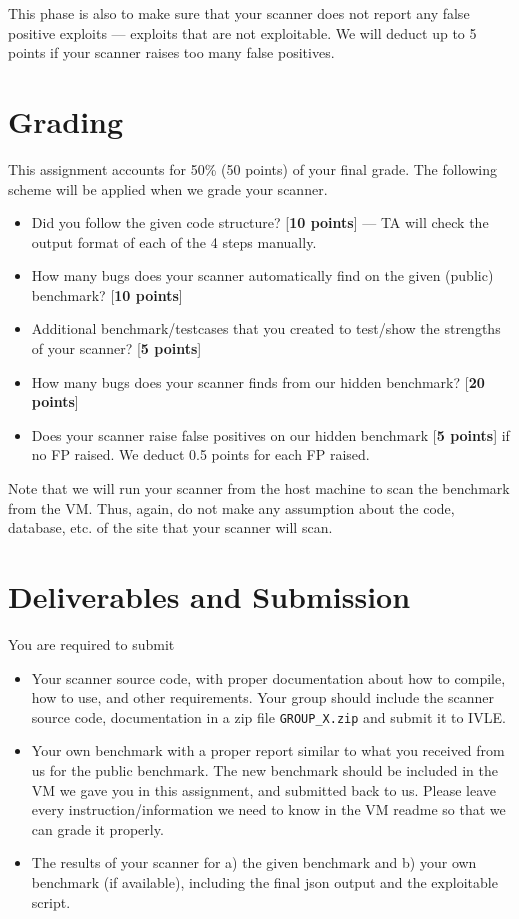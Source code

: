 \documentclass{article}[10pt]
\begin{document}
This phase is also to make sure that your scanner does not report any false positive exploits --- exploits that are not exploitable. We will deduct up to 5 points if your scanner raises too many false positives.


\section{Grading}
This assignment accounts for 50\% (50 points) of your final grade. The following scheme will be applied when we grade your scanner.
	\begin{itemize}
	\item Did you follow the given code structure? [{\bf 10 points}] --- TA will check the output format of each of the 4 steps manually.
	\item How many bugs does your scanner automatically find on the given (public) benchmark? [{\bf 10 points}]
	\item Additional benchmark/testcases that you created to test/show the strengths of your scanner? [{\bf 5 points}]
	\item How many bugs does your scanner finds from our hidden benchmark? [{\bf 20 points}]
	\item Does your scanner raise false positives on our hidden benchmark [{\bf 5 points}] if no FP raised. We deduct 0.5 points for each FP raised.
	\end{itemize}

Note that we will run your scanner from the host machine to scan the benchmark from the VM. Thus, again, do not make any assumption about the code, database, etc. of the site that your scanner will scan.

\section{Deliverables and Submission}
\label{deliverables}
You are required to submit
\begin{itemize}
	\item Your scanner source code, with proper documentation about how to compile, how to use, and other requirements. Your group should include the scanner source code, documentation in a zip file {\tt GROUP\_X.zip} and submit it to IVLE.
	
	\item Your own benchmark with a proper report similar to what you received from us for the public benchmark. The new benchmark should be included in the VM we gave you in this assignment, and submitted back to us. Please leave every instruction/information we need to know in the VM readme so that we can grade it properly.

	\item The results of your scanner for a) the given benchmark and b) your own benchmark (if available), including the final json output and the exploitable script.	
\end{itemize}
\end{document}
